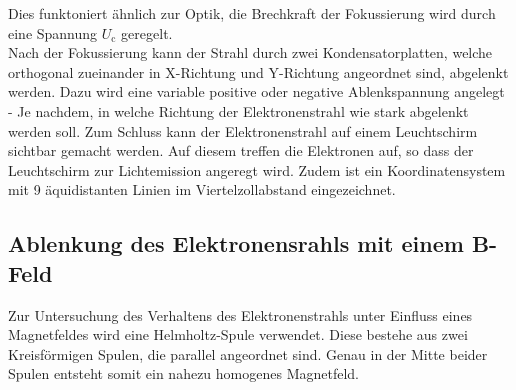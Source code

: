 Dies funktoniert ähnlich zur Optik, die Brechkraft der Fokussierung wird durch eine Spannung $U_\text{c}$ geregelt.\\
Nach der Fokussierung kann der Strahl durch zwei Kondensatorplatten, welche orthogonal zueinander in X-Richtung und Y-Richtung angeordnet sind, abgelenkt werden.
Dazu wird eine variable positive oder negative Ablenkspannung angelegt - Je nachdem, in welche Richtung der Elektronenstrahl wie stark abgelenkt werden soll.
Zum Schluss kann der Elektronenstrahl auf einem Leuchtschirm sichtbar gemacht werden.
Auf diesem treffen die Elektronen auf, so dass der Leuchtschirm zur Lichtemission angeregt wird.
Zudem ist ein Koordinatensystem mit 9 äquidistanten Linien im Viertelzollabstand eingezeichnet.

\subsection{Ablenkung des Elektronensrahls mit einem B-Feld}
Zur Untersuchung des Verhaltens des Elektronenstrahls unter Einfluss eines Magnetfeldes wird eine Helmholtz-Spule verwendet.
Diese bestehe aus zwei Kreisförmigen Spulen, die parallel angeordnet sind.
Genau in der Mitte beider Spulen entsteht somit ein nahezu homogenes Magnetfeld.
